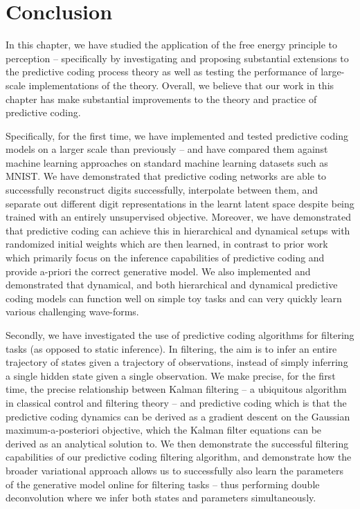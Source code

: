 \section{Conclusion}

In this chapter, we have studied the application of the free energy principle to perception -- specifically by investigating and proposing substantial extensions to the predictive coding process theory \citep{friston2003learning,friston2005theory,friston2008hierarchical} as well as testing the performance of large-scale implementations of the theory. Overall, we believe that our work in this chapter has make substantial improvements to the theory and practice of predictive coding.

Specifically, for the first time, we have implemented and tested predictive coding models on a larger scale than previously -- and have compared them against machine learning approaches on standard machine learning datasets such as MNIST. We have demonstrated that predictive coding networks are able to successfully reconstruct digits successfully, interpolate between them, and separate out different digit representations in the learnt latent space despite being trained with an entirely unsupervised objective. Moreover, we have demonstrated that predictive coding can achieve this in hierarchical and dynamical setups with randomized initial weights which are then learned, in contrast to prior work \citep{friston2008DEM,friston2008hierarchical,friston2005theory} which primarily focus on the inference capabilities of predictive coding and provide a-priori the correct generative model. We also implemented and demonstrated that dynamical, and both hierarchical and dynamical predictive coding models can function well on simple toy tasks and can very quickly learn various challenging wave-forms.

Secondly, we have investigated the use of predictive coding algorithms for filtering tasks (as opposed to static inference). In filtering, the aim is to infer an entire trajectory of states given a trajectory of observations, instead of simply inferring a single hidden state given a single observation. We make precise, for the first time, the precise relationship between Kalman filtering -- a ubiquitous algorithm in classical control and filtering theory -- and predictive coding which is that the predictive coding dynamics can be derived as a gradient descent on the Gaussian maximum-a-posteriori objective, which the Kalman filter equations can be derived as an analytical solution to. We then demonstrate the successful filtering capabilities of our predictive coding filtering algorithm, and demonstrate how the broader variational approach allows us to successfully also learn the parameters of the generative model online for filtering tasks -- thus performing double deconvolution where we infer both states and parameters simultaneously. 

